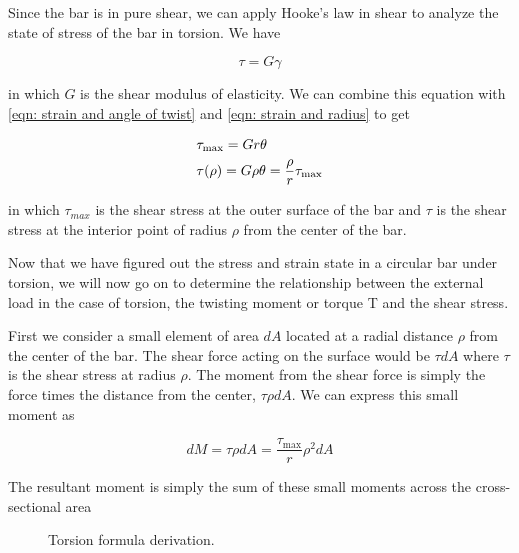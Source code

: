 \documentclass[
10pt,
a4paper,
openany,
svgnames,
]{book}
\begin{document}
Since the bar is in pure shear, we can apply Hooke’s law in shear to analyze the state of stress of the bar in torsion. We have

$$\tau  = G\gamma $$

in which $G$ is the shear modulus of elasticity. We can combine this equation with \cref{eqn: strain and angle of twist} and \cref{eqn: strain and radius} to get

\begin{equation}
  \begin{gathered}
    \tau _{\max } = Gr\theta  \hfill \\
    \tau (\rho ) = G\rho \theta  = \dfrac{\rho }{r}\tau _{\max } \hfill \\ 
  \end{gathered}
\end{equation}

in which $\tau_{max}$ is the shear stress at the outer surface of the bar and $\tau$ is the shear stress at the interior point of radius $\rho$ from the center of the bar.

Now that we have figured out the stress and strain state in a circular bar under torsion, we will now go on to determine the relationship between the external load in the case of torsion, the twisting moment or torque T and the shear stress.

First we consider a small element of area $dA$ located at a radial distance $\rho$ from the center of the bar. The shear force acting on the surface would be $\tau dA$ where $\tau$ is the shear stress at radius $\rho$. The moment from the shear force is simply the force times the distance from the center, $\tau \rho dA$. We can express this small moment as

\[dM = \tau \rho dA = \frac{\tau _{\max }}{r}\rho ^2dA\]

The resultant moment is simply the sum of these small moments across the cross-sectional area

\begin{figure}[h]
  \centering
  \caption{Torsion formula derivation.}
\end{figure}
\end{document}
